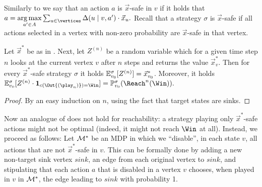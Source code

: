 Similarly to  we say that an action $a$ is $\vec{x}$-safe in $v$ if it holds that $a= \underset{a' \in \actions}{\arg\max} \sum_{u\in \vertices} 
\probTranFunc(u\mid v,a') \cdot\vec{x}_u.$ Recall that a strategy $\sigma$ is $\vec{x}$-safe if all actions selected in a vertex with non-zero probability are $\vec{x}$-safe in that vertex. 

\begin{lemma}
\label{5-lem:quant-reach-value-distribution}
Let $ \vec{x}^* $ be as in . 
Next, let $Z^{(n)}$ be a random variable which for a given time step $n$ looks at the current vertex $v$ after $n$ steps and returns the value $\vec{x}^*_v$. Then for every $\vec{x}^*$-safe strategy $\sigma$ it holds $\mathbb{E}^\sigma_{v_0}[Z^{(n)}] = \vec{x}^*_{v_0}$. Moreover, it holds $\expv^\sigma_{\vinit}[Z^{(n)}\cdot \indicator{\colouring{(\Out{(\play_{n})})}=\Win}] = \probm^\sigma_{\vinit}(\Reach^n(\Win)).$
\end{lemma}
\begin{proof}
By an easy induction on $n$, using the fact that target states are  sinks.
\end{proof}



Now an analogue of  does not hold for reachability: a strategy playing only $\vec{x}^*$-safe actions might not be optimal (indeed, it might not reach $\Win$ at all). Instead, we proceed as follows: Let $\mathcal{M}^*$ be an MDP in which we ``disable'', in each state $v$, all actions that are not $\vec{x}^*$-safe in $v$. This can be formally done by adding a new non-target sink vertex $ \mathit{sink} $, an edge from each original vertex to $ \mathit{sink} $, and stipulating that each action $a$ that is disabled in a vertex $ v $ chooses, when played in $ v $ in $ \mathcal{M}^*$, the edge leading to $ \mathit{sink} $ with probability 1. 


